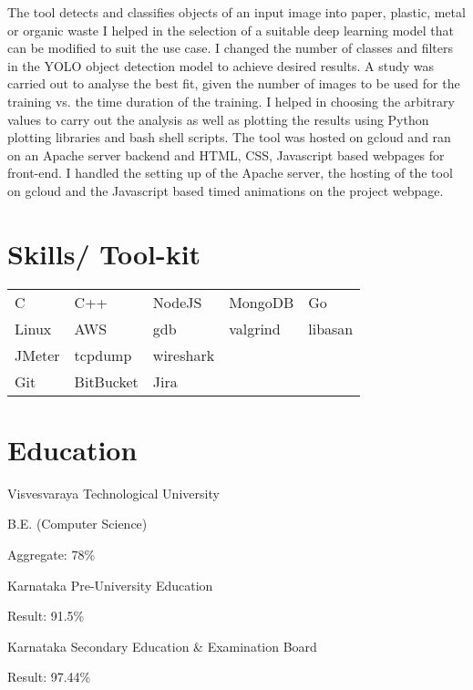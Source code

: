 \documentclass{resume_v01}
\begin{document}
\workitems
{The tool detects and classifies objects of an input image into paper, plastic, metal or organic waste}
{I helped in the selection of a suitable deep learning model that can be modified to suit the use case. I changed the number of classes and filters in the YOLO object detection model to achieve desired results.}
{A study was carried out to analyse the best fit, given the number of images to be used for the training vs. the time duration of the training. I helped in choosing the arbitrary values to carry out the analysis as well as plotting the results using Python plotting libraries and bash shell scripts.}
{The tool was hosted on gcloud and ran on an Apache server backend and HTML, CSS, Javascript based webpages for front-end. I handled the setting up of the Apache server, the hosting of the tool on gcloud and the Javascript based timed animations on the project webpage.}

\section{Skills/ Tool-kit}
\begin{tabular}{l l l l l}
C & C++ & NodeJS & MongoDB  & Go  \\
Linux & AWS & gdb & valgrind & libasan \\
JMeter & tcpdump & wireshark \\
Git & BitBucket & Jira \\

\end{tabular}

\section{Education}
\par Visvesvaraya Technological University
\par B.E. (Computer Science)
\par Aggregate: 78\%

\par Karnataka Pre-University Education
\par Result: 91.5\%

\par Karnataka Secondary Education \& Examination Board
\par Result: 97.44\%
\end{document}
